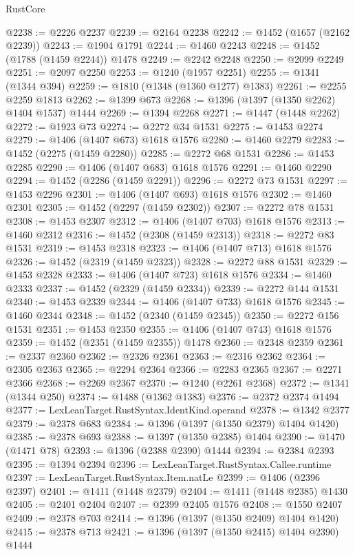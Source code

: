 \begin{lexlean}{RustCore}
\begin{coremodule}
@2238 := @2226 @2237
@2239 := @2164 @2238
@2242 := @1452 (@1657 (@2162 @2239))
@2243 := @1904 @1791
@2244 := @1460 @2243
@2248 := @1452 (@1788 (@1459 @2244)) @1478
@2249 := @2242 @2248
@2250 := @2099 @2249
@2251 := @2097 @2250
@2253 := @1240 (@1957 @2251)
@2255 := @1341 (@1344 @394)
@2259 := @1810 (@1348 (@1360 @1277) @1383)
@2261 := @2255 @2259 @1813
@2262 := @1399 @673
@2268 := @1396 (@1397 (@1350 @2262) @1404 @1537) @1444
@2269 := @1394 @2268
@2271 := @1447 (@1448 @2262)
@2272 := @1923 @73
@2274 := @2272 @34 @1531
@2275 := @1453 @2274
@2279 := @1406 (@1407 @673) @1618 @1576
@2280 := @1460 @2279
@2283 := @1452 (@2275 (@1459 @2280))
@2285 := @2272 @68 @1531
@2286 := @1453 @2285
@2290 := @1406 (@1407 @683) @1618 @1576
@2291 := @1460 @2290
@2294 := @1452 (@2286 (@1459 @2291))
@2296 := @2272 @73 @1531
@2297 := @1453 @2296
@2301 := @1406 (@1407 @693) @1618 @1576
@2302 := @1460 @2301
@2305 := @1452 (@2297 (@1459 @2302))
@2307 := @2272 @78 @1531
@2308 := @1453 @2307
@2312 := @1406 (@1407 @703) @1618 @1576
@2313 := @1460 @2312
@2316 := @1452 (@2308 (@1459 @2313))
@2318 := @2272 @83 @1531
@2319 := @1453 @2318
@2323 := @1406 (@1407 @713) @1618 @1576
@2326 := @1452 (@2319 (@1459 @2323))
@2328 := @2272 @88 @1531
@2329 := @1453 @2328
@2333 := @1406 (@1407 @723) @1618 @1576
@2334 := @1460 @2333
@2337 := @1452 (@2329 (@1459 @2334))
@2339 := @2272 @144 @1531
@2340 := @1453 @2339
@2344 := @1406 (@1407 @733) @1618 @1576
@2345 := @1460 @2344
@2348 := @1452 (@2340 (@1459 @2345))
@2350 := @2272 @156 @1531
@2351 := @1453 @2350
@2355 := @1406 (@1407 @743) @1618 @1576
@2359 := @1452 (@2351 (@1459 @2355)) @1478
@2360 := @2348 @2359
@2361 := @2337 @2360
@2362 := @2326 @2361
@2363 := @2316 @2362
@2364 := @2305 @2363
@2365 := @2294 @2364
@2366 := @2283 @2365
@2367 := @2271 @2366
@2368 := @2269 @2367
@2370 := @1240 (@2261 @2368)
@2372 := @1341 (@1344 @250)
@2374 := @1488 (@1362 @1383)
@2376 := @2372 @2374 @1494
@2377 := LexLeanTarget.RustSyntax.IdentKind.operand
@2378 := @1342 @2377
@2379 := @2378 @683
@2384 := @1396 (@1397 (@1350 @2379) @1404 @1420)
@2385 := @2378 @693
@2388 := @1397 (@1350 @2385) @1404
@2390 := @1470 (@1471 @78)
@2393 := @1396 (@2388 @2390) @1444
@2394 := @2384 @2393
@2395 := @1394 @2394
@2396 := LexLeanTarget.RustSyntax.Callee.runtime
@2397 := LexLeanTarget.RustSyntax.Item.natLe
@2399 := @1406 (@2396 @2397)
@2401 := @1411 (@1448 @2379)
@2404 := @1411 (@1448 @2385) @1430
@2405 := @2401 @2404
@2407 := @2399 @2405 @1576
@2408 := @1550 @2407
@2409 := @2378 @703
@2414 := @1396 (@1397 (@1350 @2409) @1404 @1420)
@2415 := @2378 @713
@2421 := @1396 (@1397 (@1350 @2415) @1404 @2390) @1444

\end{coremodule}
\end{lexlean}
